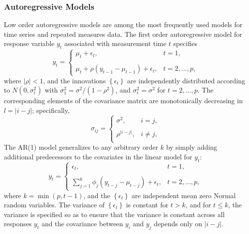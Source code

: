 
\subsubsection{Autoregressive Models}

Low order autoregressive models are among the most frequently used models for time series and repeated measures data. The first order autoregressive model for response variable $y_t$ associated with measurement time $t$ specifies
\begin{equation}\label{eq:ar-1-model}
y_{t} = \left\{ \begin{array}{lr}
\mu_t + \epsilon_t, & t = 1,\\
& \\
\mu_t + \rho\left(y_{t-1} - \mu_{t-1}\right) + \epsilon_t, & t = 2,\dots, p,
\end{array}\right.
\end{equation}
\noindent 
where $\vert \rho \vert < 1$, and the innovations $\left\{\epsilon_t\right\}$ are independently distributed according to $N\left(0,\sigma_t^2\right)$ with $\sigma_1^2 = \sigma^2/\left(1-\rho^2\right)$, and $\sigma_t^2 = \sigma^2$ for $t = 2, \dots, p$. The corresponding elements of the covariance matrix are monotonically decreasing in $l = \vert i-j \vert$; specifically,
\begin{equation}\label{eq:compound-symmetric-model}
\sigma_{ij} = \left\{ \begin{array}{lr}
\sigma^2, & i = j, \\
& \\
\rho^{\vert i - j \vert}, & i \ne j,\\
\end{array}\right.
\end{equation}
\noindent
The AR(1) model generalizes to any arbitrary order $k$ by simply adding additional predecessors to the covariates in the linear model for $y_t$:
\begin{equation*}
y_{t} = \left\{ \begin{array}{lr}
\epsilon_t, & t = 1,\\
& \\
\sum\limits_{j = 1}^{k} \phi_j\left(y_{t-j} - \mu_{t-j}\right) + \epsilon_t, & t = 2, \dots, p,
\end{array}\right.
\end{equation*}
\noindent
where $k = \min\left(p,t-1\right)$, and the $\left\{\epsilon_t\right\}$ are independent mean zero Normal random variables. The variance of $\left\{\epsilon_t\right\}$ is constant for $t > k$, and for $t \le k$, the variance is specified so as to ensure that the variance is constant across all responses $y_t$ and the covariance between $y_i$ and $y_j$ depends only on $\vert i - j\vert$. 

